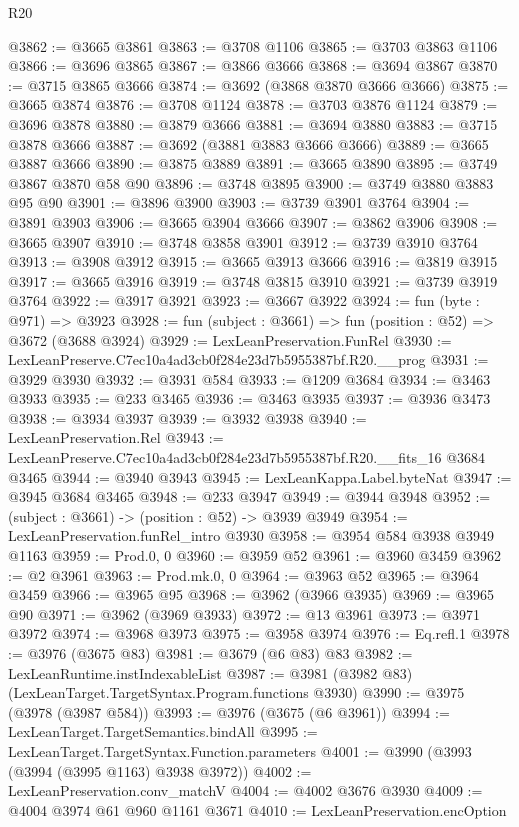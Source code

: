 \begin{lexlean}{R20}
\begin{coremodule}
@3862 := @3665 @3861
@3863 := @3708 @1106
@3865 := @3703 @3863 @1106
@3866 := @3696 @3865
@3867 := @3866 @3666
@3868 := @3694 @3867
@3870 := @3715 @3865 @3666
@3874 := @3692 (@3868 @3870 @3666 @3666)
@3875 := @3665 @3874
@3876 := @3708 @1124
@3878 := @3703 @3876 @1124
@3879 := @3696 @3878
@3880 := @3879 @3666
@3881 := @3694 @3880
@3883 := @3715 @3878 @3666
@3887 := @3692 (@3881 @3883 @3666 @3666)
@3889 := @3665 @3887 @3666
@3890 := @3875 @3889
@3891 := @3665 @3890
@3895 := @3749 @3867 @3870 @58 @90
@3896 := @3748 @3895
@3900 := @3749 @3880 @3883 @95 @90
@3901 := @3896 @3900
@3903 := @3739 @3901 @3764
@3904 := @3891 @3903
@3906 := @3665 @3904 @3666
@3907 := @3862 @3906
@3908 := @3665 @3907
@3910 := @3748 @3858 @3901
@3912 := @3739 @3910 @3764
@3913 := @3908 @3912
@3915 := @3665 @3913 @3666
@3916 := @3819 @3915
@3917 := @3665 @3916
@3919 := @3748 @3815 @3910
@3921 := @3739 @3919 @3764
@3922 := @3917 @3921
@3923 := @3667 @3922
@3924 := fun (byte : @971) => @3923
@3928 := fun (subject : @3661) => fun (position : @52) => @3672 (@3688 @3924)
@3929 := LexLeanPreservation.FunRel
@3930 := LexLeanPreserve.C7ec10a4ad3cb0f284e23d7b5955387bf.R20.__prog
@3931 := @3929 @3930
@3932 := @3931 @584
@3933 := @1209 @3684
@3934 := @3463 @3933
@3935 := @233 @3465
@3936 := @3463 @3935
@3937 := @3936 @3473
@3938 := @3934 @3937
@3939 := @3932 @3938
@3940 := LexLeanPreservation.Rel
@3943 := LexLeanPreserve.C7ec10a4ad3cb0f284e23d7b5955387bf.R20.__fits_16 @3684 @3465
@3944 := @3940 @3943
@3945 := LexLeanKappa.Label.byteNat
@3947 := @3945 @3684 @3465
@3948 := @233 @3947
@3949 := @3944 @3948
@3952 := (subject : @3661) -> (position : @52) -> @3939 @3949
@3954 := LexLeanPreservation.funRel_intro @3930
@3958 := @3954 @584 @3938 @3949 @1163
@3959 := Prod.{0, 0}
@3960 := @3959 @52
@3961 := @3960 @3459
@3962 := @2 @3961
@3963 := Prod.mk.{0, 0}
@3964 := @3963 @52
@3965 := @3964 @3459
@3966 := @3965 @95
@3968 := @3962 (@3966 @3935)
@3969 := @3965 @90
@3971 := @3962 (@3969 @3933)
@3972 := @13 @3961
@3973 := @3971 @3972
@3974 := @3968 @3973
@3975 := @3958 @3974
@3976 := Eq.refl.{1}
@3978 := @3976 (@3675 @83)
@3981 := @3679 (@6 @83) @83
@3982 := LexLeanRuntime.instIndexableList
@3987 := @3981 (@3982 @83) (LexLeanTarget.TargetSyntax.Program.functions @3930)
@3990 := @3975 (@3978 (@3987 @584))
@3993 := @3976 (@3675 (@6 @3961))
@3994 := LexLeanTarget.TargetSemantics.bindAll
@3995 := LexLeanTarget.TargetSyntax.Function.parameters
@4001 := @3990 (@3993 (@3994 (@3995 @1163) @3938 @3972))
@4002 := LexLeanPreservation.conv_matchV
@4004 := @4002 @3676 @3930
@4009 := @4004 @3974 @61 @960 @1161 @3671
@4010 := LexLeanPreservation.encOption

\end{coremodule}
\end{lexlean}
